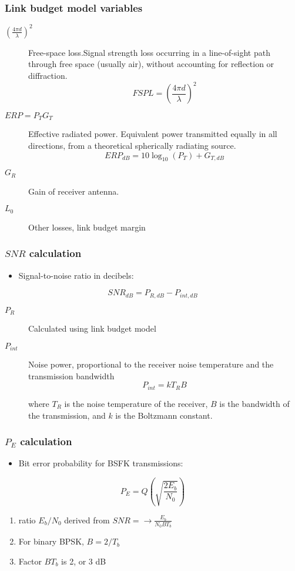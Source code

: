 \documentclass{beamer}
\begin{document}
\begin{frame}
	\frametitle{Link budget model variables}
	\begin{description}
		\item[$(\frac{4 \pi d}{\lambda})^2$] Free-space loss.Signal strength loss occurring in a line-of-sight path through free space (usually air), without accounting for reflection or diffraction.
			\begin{equation}
	{FSPL} = \left(\frac{4 \pi d}{\lambda}\right)^2
			\end{equation}
		\item[$ERP = P_T G_T$] Effective radiated power. Equivalent power transmitted equally in all directions, from a theoretical spherically radiating source.
			\begin{equation}
	{ERP}_{dB} = 10\log_{10}(P_T) + G_{T, dB}
			\end{equation}
		\item[$G_R$] Gain of receiver antenna.
		\item[$L_0$] Other losses, link budget margin
	\end{description}
\end{frame}

\begin{frame}
	\frametitle{$SNR$ calculation}
	\begin{itemize}
		\item Signal-to-noise ratio in decibels:
	\end{itemize}
	\begin{equation}
		{SNR}_{dB} = P_{R, dB} - P_{int, dB}
	\end{equation}
	\begin{description}
		\item[$P_R$] Calculated using link budget model
		\item[$P_{int}$] Noise power, proportional to the receiver noise temperature and the transmission bandwidth
			\begin{equation}
	P_{int} = k T_R B
\end{equation}

where $T_R$ is the noise temperature of the receiver, $B$ is the bandwidth of the transmission, and $k$ is the Boltzmann constant.
	\end{description}
\end{frame}

\begin{frame}
	\frametitle{$P_E$ calculation}
	\begin{itemize}
		\item Bit error probability for BSFK transmissions:
	\end{itemize}
	\begin{equation}
		P_E = Q\left(\sqrt{\frac{2E_b}{N_0}}\right)
	\end{equation}
	\begin{enumerate}
		\item ratio $E_b / N_0$ derived from $SNR = \rightarrow \frac{E_b}{N_0 B T_b}$
		\item For binary BPSK, $B = 2/T_b$
		\item Factor $B T_b$ is 2, or 3 dB
	\end{enumerate}
\end{frame}
\end{document}
